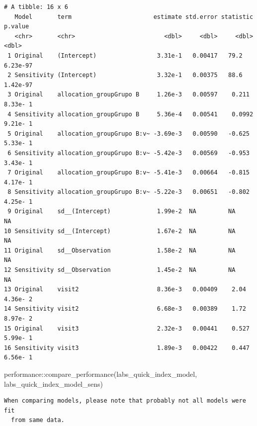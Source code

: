 \documentclass[
  letterpaper,
  DIV=11,
  numbers=noendperiod]{scrartcl}
\newenvironment{Shaded}{\begin{snugshade}}{\end{snugshade}}
\newcommand{\FunctionTok}[1]{\textcolor[rgb]{0.28,0.35,0.67}{#1}}
\newcommand{\NormalTok}[1]{\textcolor[rgb]{0.00,0.23,0.31}{#1}}
\newcommand{\SpecialCharTok}[1]{\textcolor[rgb]{0.37,0.37,0.37}{#1}}
\begin{document}
\begin{verbatim}
# A tibble: 16 x 6
   Model       term                       estimate std.error statistic   p.value
   <chr>       <chr>                         <dbl>     <dbl>     <dbl>     <dbl>
 1 Original    (Intercept)                 3.31e-1   0.00417   79.2     6.23e-97
 2 Sensitivity (Intercept)                 3.32e-1   0.00375   88.6     1.42e-97
 3 Original    allocation_groupGrupo B     1.26e-3   0.00597    0.211   8.33e- 1
 4 Sensitivity allocation_groupGrupo B     5.36e-4   0.00541    0.0992  9.21e- 1
 5 Original    allocation_groupGrupo B:v~ -3.69e-3   0.00590   -0.625   5.33e- 1
 6 Sensitivity allocation_groupGrupo B:v~ -5.42e-3   0.00569   -0.953   3.43e- 1
 7 Original    allocation_groupGrupo B:v~ -5.41e-3   0.00664   -0.815   4.17e- 1
 8 Sensitivity allocation_groupGrupo B:v~ -5.22e-3   0.00651   -0.802   4.25e- 1
 9 Original    sd__(Intercept)             1.99e-2  NA         NA      NA       
10 Sensitivity sd__(Intercept)             1.67e-2  NA         NA      NA       
11 Original    sd__Observation             1.58e-2  NA         NA      NA       
12 Sensitivity sd__Observation             1.45e-2  NA         NA      NA       
13 Original    visit2                      8.36e-3   0.00409    2.04    4.36e- 2
14 Sensitivity visit2                      6.68e-3   0.00389    1.72    8.97e- 2
15 Original    visit3                      2.32e-3   0.00441    0.527   5.99e- 1
16 Sensitivity visit3                      1.89e-3   0.00422    0.447   6.56e- 1
\end{verbatim}

\begin{Shaded}
\begin{Highlighting}[]
\NormalTok{performance}\SpecialCharTok{::}\FunctionTok{compare\_performance}\NormalTok{(labs\_quick\_index\_model, labs\_quick\_index\_model\_sens)}
\end{Highlighting}
\end{Shaded}

\begin{verbatim}
When comparing models, please note that probably not all models were fit
  from same data.
\end{verbatim}
\end{document}
